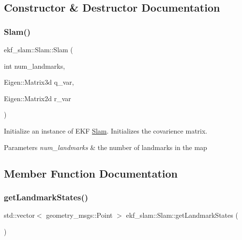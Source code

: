 \subsection{Constructor \& Destructor Documentation}
\mbox{\label{classekf__slam_1_1Slam_abc573b570700f3dfb0ff1e80c0263255}} 
\subsubsection{\texorpdfstring{Slam()}{Slam()}}
{\footnotesize\ttfamily ekf\+\_\+slam\+::\+Slam\+::\+Slam (\begin{DoxyParamCaption}\item[{int}]{num\+\_\+landmarks,  }\item[{Eigen\+::\+Matrix3d}]{q\+\_\+var,  }\item[{Eigen\+::\+Matrix2d}]{r\+\_\+var }\end{DoxyParamCaption})}



Initialize an instance of E\+KF \hyperlink{classekf__slam_1_1Slam}{Slam}. Initializes the covarience matrix. 


\begin{DoxyParams}{Parameters}
{\em num\+\_\+landmarks} & the number of landmarks in the map \\
\hline
\end{DoxyParams}


\subsection{Member Function Documentation}
\mbox{\label{classekf__slam_1_1Slam_a66a7be45bb77f0c44717385908443832}} 
\subsubsection{\texorpdfstring{get\+Landmark\+States()}{getLandmarkStates()}}
{\footnotesize\ttfamily std\+::vector$<$ geometry\+\_\+msgs\+::\+Point $>$ ekf\+\_\+slam\+::\+Slam\+::get\+Landmark\+States (\begin{DoxyParamCaption}{ }\end{DoxyParamCaption})}



